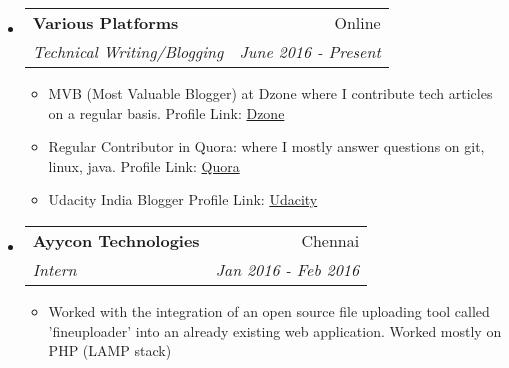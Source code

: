 \documentclass[letterpaper,11pt]{article}
\makeatletter
\newcommand{\resitem}[1]{\item #1 \vspace{-2pt}}
\newcommand{\ressubheading}[4]{
\begin{tabular*}{6.5in}{l@{\extracolsep{\fill}}r}
		\textbf{#1} & #2 \\
		\textit{#3} & \textit{#4} \\
\end{tabular*}\vspace{-6pt}}
\makeatother
\begin{document}
\begin{itemize}
\item
	\ressubheading{Various Platforms}{Online}{Technical Writing/Blogging}{June 2016 - Present}
	\begin{itemize}
		\resitem{MVB (Most Valuable Blogger) at Dzone where I contribute tech articles on a regular basis.
		Profile Link: \href{https://dzone.com/users/3081568/sudip-bhandari.html}{Dzone}} 
		\resitem{Regular Contributor in Quora: where I mostly answer questions on git, linux, java. 
		Profile Link: \href{https://www.quora.com/profile/Sudip-Bhandari}{Quora}}
		\resitem{Udacity India Blogger}{I contribute articles related to Machine Learning}
		Profile Link: \href{https://medium.com/@UdacityINDIA/difference-between-machine-learning-deep-learning-and-artificial-intelligence-d005ae5f23c}{Udacity}
		\end{itemize}
\end{itemize}




\begin{itemize}
	\item
\ressubheading{Ayycon Technologies}{Chennai}{Intern}{Jan 2016 - Feb 2016}
	\begin{itemize}
		\resitem{Worked with the integration of an open source file uploading tool called 'fineuploader' into an already existing web application. Worked mostly on PHP (LAMP stack)}
	\end{itemize}
\end{itemize}
 
\end{document}
